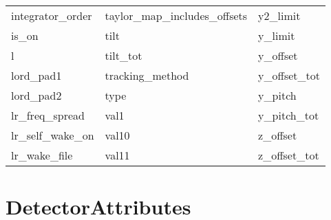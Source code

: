 \begin{tabular}{lll}
integrator_order            & taylor_map_includes_offsets & y2_limit                    \\
is_on                       & tilt                        & y_limit                     \\
l                           & tilt_tot                    & y_offset                    \\
lord_pad1                   & tracking_method             & y_offset_tot                \\
lord_pad2                   & type                        & y_pitch                     \\
lr_freq_spread              & val1                        & y_pitch_tot                 \\
lr_self_wake_on             & val10                       & z_offset                    \\
lr_wake_file                & val11                       & z_offset_tot                \\
 \bottomrule
 \end{tabular}
 \vfill
 
 \section{DetectorAttributes}
 \label{s:list.detector}
 
